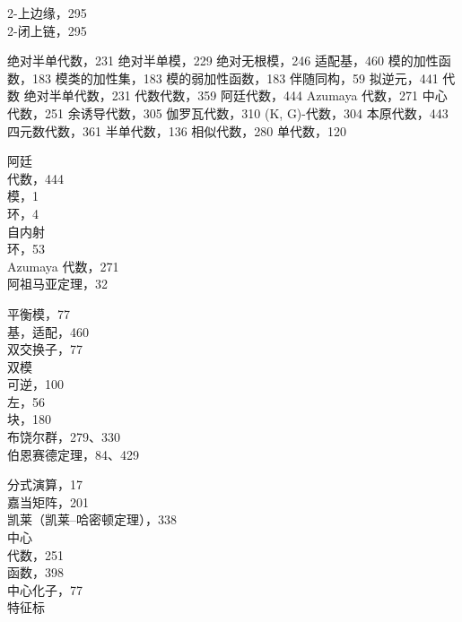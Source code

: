 
2-上边缘，295\\
2-闭上链，295


绝对半单代数，231 绝对半单模，229 绝对无根模，246 适配基，460 模的加性函数，183 模类的加性集，183 模的弱加性函数，183 伴随同构，59 拟逆元，441 代数 绝对半单代数，231 代数代数，359 阿廷代数，444 Azumaya 代数，271 中心代数，251 余诱导代数，305 伽罗瓦代数，310 (K, G)-代数，304 本原代数，443 四元数代数，361 半单代数，136 相似代数，280 单代数，120

阿廷\\
代数，444\\
模，1\\
环，4\\
自内射\\
环，53\\
Azumaya 代数，271\\
阿祖马亚定理，32


平衡模，77\\
基，适配，460\\
双交换子，77\\
双模\\
可逆，100\\
左，56\\
块，180\\
布饶尔群，279、330\\
伯恩赛德定理，84、429


分式演算，17\\
嘉当矩阵，201\\
凯莱（凯莱–哈密顿定理），338\\
中心\\
代数，251\\
函数，398\\
中心化子，77\\
特征标

